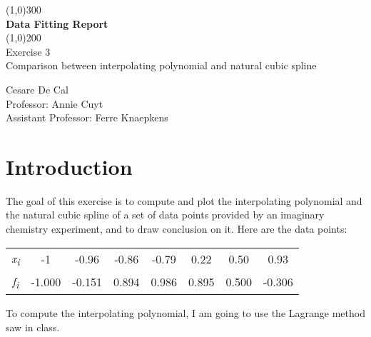 \documentclass{article}
\begin{document}
\begin{titlepage}
	\begin{center}
	\line(1,0){300}\\
	[0.25in]
	\huge{\bfseries Data Fitting Report}  \\
	[2mm]
	\line(1,0){200} \\
	[1.5cm]
	\LARGE{Exercise 3} \\
	[0.25cm]
	\Large{Comparison between interpolating polynomial and natural cubic spline} \\
	[12cm]
	\end{center}
	
	\begin{flushright}
	\large{Cesare De Cal \\
	[0.25cm]
	Professor: Annie Cuyt \\
	[0.25cm]
	Assistant Professor: Ferre Knaepkens \\
	}
	\end{flushright}
\end{titlepage}

\section{Introduction}\label{sec:intro}
The goal of this exercise is to compute and plot the interpolating polynomial and the natural cubic spline of a set of data points provided by an imaginary chemistry experiment, and to draw conclusion on it. Here are the data points:

  \begin{table}[!ht]
    \large        %
    \centering    %
    \begin{tabular}{|c|c|c|c|c|c|c|c|}
    \hline
    \it{x}\textsubscript{i}&-1&-0.96&-0.86&-0.79&0.22&0.50&0.93\\     %
    \it{f}\textsubscript{i}&-1.000&-0.151&0.894&0.986&0.895&0.500&-0.306\\
    \hline        %
    \end{tabular}
  \end{table}
To compute the interpolating polynomial, I am going to use the Lagrange method saw in class.


  
\end{document}
